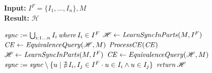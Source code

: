 %	
%


	\begin{algorithm}[tb]
		\small
		\caption{Extended Synchronous Compositional Learning Algorithm}
		\label{alg:SCLalg}
		\hspace*{\algorithmicindent}
		\textbf{Input:} $I^F=\{I_1,\dots,I_n\},M$\\
		\hspace*{\algorithmicindent}
		\textbf{Result:}  $\mathscr{H}$
		\begin{algorithmic}[1]
		\State ${\it sync}:=\bigcup_ {i:1\dots n} I_i \, {\it where}\, I_i\in I^F$ \label{alg:sync}
  		\State $\mathscr{H}\leftarrow {\it LearnSyncInParts}(M,I^F)$\label{alg:Lerarnsync}
			\State ${\it CE}\leftarrow {\it EquivalenceQuery} (\mathscr{H},M)$\label{alg:CEequi}
			\label{alg:while}
			\State ${\it ProcessCE}({\it CE})$\label{alg:processCE}
			\State $\mathscr{H}\leftarrow {\it LearnSyncInParts}(M,I^F)$\label{alg:secondLearn}
			\State ${\it CE}\leftarrow {\it EquivalenceQuery}(\mathscr{H},M)$\label{alg:CEequisecond}
			\EndWhile
   \State ${\it sync}:={\it sync}\setminus\{u\mid \nexists\, I_i,I_j\in I^F\cdot u\in I_i \wedge u\in I_j\}$\label{alg:updatesyncsecnd}
			\State ${\it return}\,\mathscr{H}$   \label{alg:return}
		\end{algorithmic}
	\end{algorithm}


